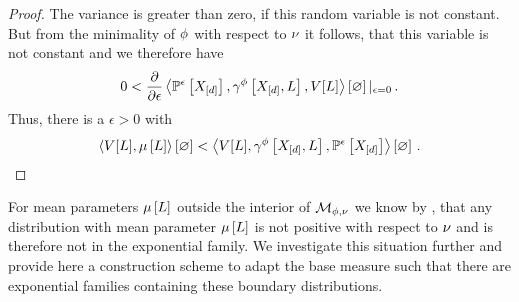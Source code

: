 \begin{proof}
		The variance is greater than zero, if this random variable is not constant.
		But from the minimality of $\phi$ with respect to $\nu$ it follows, that this variable is not constant and we therefore have
		\begin{align*}
			0 < \frac{\partial }{\partial \epsilon} \left\langle \mathbb{P}^{\epsilon}\left[X_{[d]}\right],\gamma^{\phi}\left[X_{[d]},L\right],V[L]\right\rangle \left[ \varnothing \right]|_{\epsilon=0} \, . 
		\end{align*}
		Thus, there is a $\epsilon>0$ with 
		\begin{align*}
			\left\langle V[L],\mu\left[L\right]\right\rangle \left[ \varnothing \right] < \left\langle V[L],\gamma^{\phi}\left[X_{[d]},L\right],\mathbb{P}^{\epsilon}\left[X_{[d]}\right]\right\rangle \left[ \varnothing \right] \, .
		\end{align*}

\end{proof}



For mean parameters $\mu\left[L\right]$ outside the interior of $\mathcal{M}_{\phi,\nu}$ we know by , that any distribution with mean parameter $\mu\left[L\right]$ is not positive with respect to $\nu$ and is therefore not in the exponential family.
We investigate this situation further and provide here a construction scheme to adapt the base measure such that there are exponential families containing these boundary distributions.

